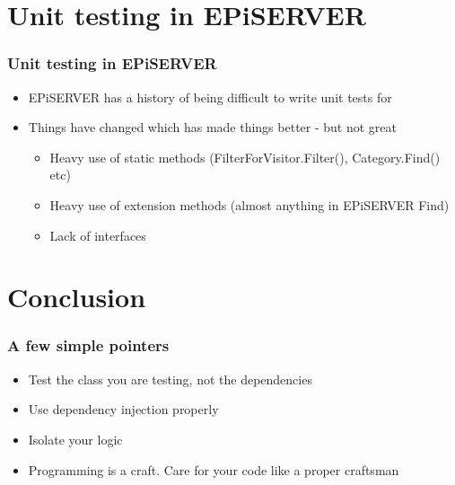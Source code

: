 \documentclass{beamer}
\begin{document}
		\section{Unit testing in EPiSERVER}
		\begin{frame}
			\frametitle{Unit testing in EPiSERVER} \pause
			\begin{itemize}
				\item EPiSERVER has a history of being difficult to write unit tests for \pause
				\item Things have changed which has made things better - but not great \pause
				\begin{itemize}
					\item Heavy use of static methods (FilterForVisitor.Filter(), Category.Find() etc) \pause
					\item Heavy use of extension methods (almost anything in EPiSERVER Find) \pause
					\item Lack of interfaces
				\end{itemize}
			\end{itemize}
		\end{frame}

		\section{Conclusion}
		\begin{frame}
			\frametitle{A few simple pointers} \pause
			\begin{itemize}
				\item Test the class you are testing, not the dependencies \pause
				\item Use dependency injection properly \pause
				\item Isolate your logic \pause
				\item Programming is a craft. Care for your code like a proper craftsman 
			\end{itemize}
		\end{frame}
\end{document}
